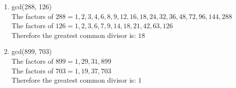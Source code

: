 \documentclass[11pt]{article}
\begin{document}
\begin{enumerate}

\item
gcd(288, 126)\\
The factors of $ 288 = 1, 2, 3, 4, 6, 8, 9, 12, 16, 18, 24, 32, 36, 48, 72, 96, 144, 288 $\\
The factors of $ 126 = 1, 2, 3, 6, 7, 9, 14, 18, 21, 42, 63, 126 $\\
Therefore the greatest common divisor is: $ 18 $ \\

\bigskip
\bigskip
\bigskip

\item 
gcd(899, 703)\\
The factors of $ 899 = 1, 29, 31, 899 $\\
The factors of $ 703 = 1, 19, 37, 703 $\\
Therefore the greatest common divisor is: $ 1 $ \\

\end{enumerate}
\end{document}
